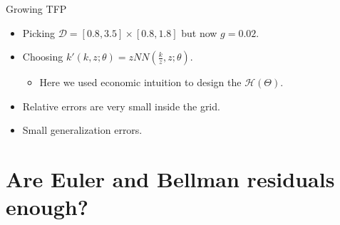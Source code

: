 \documentclass[aspectratio=169,10pt]{beamer}
\begin{document}
\begin{frame}[label = ncg_reg_growth_res]{Growing TFP}
	\begin{minipage}[t]{0.4\textwidth}
	\end{minipage}
	\hfill%
	\begin{minipage}[t]{0.5\textwidth}\raggedleft
		\begin{itemize}
			\item Picking $\mathcal{D} = [0.8,3.5]\times[0.8,1.8]$ but now $g = 0.02$.
			\smallskip
			\item Choosing $k'(k,z;\theta) = z NN(\frac{k}{z},z;\theta)$.
			\begin{itemize}
				\item Here we used economic intuition to design the $\mathcal{H}(\Theta)$.
			\end{itemize}
			\smallskip
			\item Relative errors are very small inside the grid.
			\smallskip	
			\item  Small generalization errors.
		\end{itemize}
	\end{minipage}
\end{frame}

\section{Are Euler and Bellman residuals enough?}
\end{document}
